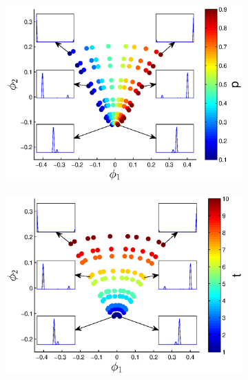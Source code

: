 \begin{figure}[t!]
\def \figwidth {0.25\textwidth}
\centering
\begin{subfigure}{\figwidth}
\includegraphics[width=\textwidth]{EMD_withhist_p_1}
\caption{}
\label{subfig:small_lambda_p}
\end{subfigure}
\begin{subfigure}{\figwidth}
\includegraphics[width=\textwidth]{EMD_withhist_t_1}
\caption{}
\label{subfig:small_lambda_t}
\end{subfigure}
\begin{subfigure}{\figwidth}

\end{subfigure}
\end{figure}
